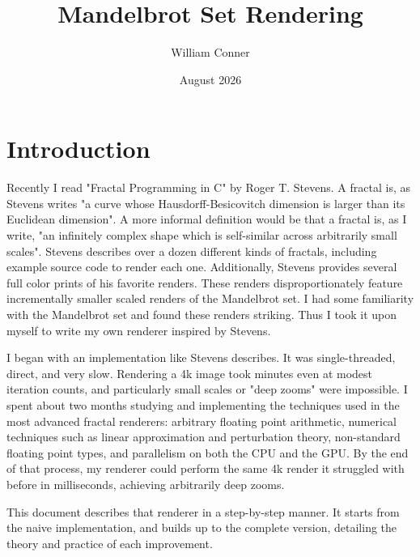 \documentclass{article}
\title{Mandelbrot Set Rendering}
\author{William Conner}
\date{August 2026}
\begin{document}
\maketitle

\section{Introduction}
\par Recently I read "Fractal Programming in C" by Roger T. Stevens\cite{Stevens_1989}. A fractal is, as Stevens writes "a curve whose Hausdorff-Besicovitch dimension is larger than its Euclidean dimension". A more informal definition would be that a fractal is, as I write, "an infinitely complex shape which is self-similar across arbitrarily small scales". Stevens describes over a dozen different kinds of fractals, including example source code to render each one. Additionally, Stevens provides several full color prints of his favorite renders. These renders disproportionately feature incrementally smaller scaled renders of the Mandelbrot set. I had some familiarity with the Mandelbrot set and found these renders striking. Thus I took it upon myself to write my own renderer inspired by Stevens.
\par I began with an implementation like Stevens describes. It was single-threaded, direct, and very slow. Rendering a 4k image took minutes even at modest iteration counts, and particularly small scales or "deep zooms" were impossible. I spent about two months studying and implementing the techniques used in the most advanced fractal renderers: arbitrary floating point arithmetic, numerical techniques such as linear approximation and perturbation theory, non-standard floating point types, and parallelism on both the CPU and the GPU. By the end of that process, my renderer could perform the same 4k render it struggled with before in milliseconds, achieving arbitrarily deep zooms.
\par This document describes that renderer in a step-by-step manner. It starts from the naive implementation, and builds up to the complete version, detailing the theory and practice of each improvement.
\end{document}

